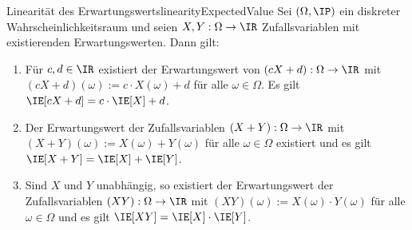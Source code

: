 \documentclass[language=ngerman,algolist]{TemplateLecture}
\begin{document}
\begin{thm}{Linearität des Erwartungswerts}{linearityExpectedValue}
    Sei $(\Omega, \IP)$ ein diskreter Wahrscheinlichkeitsraum und seien $X, Y: \Omega \to \IR$ Zufallsvariablen mit existierenden Erwartungswerten. Dann gilt:
    \begin{enumerate}[$(a)$]
        \item Für $c, d \in \IR$ existiert der Erwartungswert von $(cX + d): \Omega \to \IR$ mit $(cX + d)(\omega) := c \cdot X(\omega) + d$ für alle $\omega \in \Omega$. Es gilt $\IE[cX + d] = c \cdot \IE[X] + d$.
        \item Der Erwartungswert der Zufallsvariablen $(X + Y): \Omega \to \IR$ mit $(X + Y)(\omega) := X(\omega) + Y(\omega)$ für alle $\omega \in \Omega$ existiert und es gilt $\IE[X + Y] = \IE[X] + \IE[Y]$.
        \item Sind $X$ und $Y$ unabhängig, so existiert der Erwartungswert der Zufallsvariablen $(XY): \Omega \to \IR$ mit $(XY)(\omega) := X(\omega) \cdot Y(\omega)$ für alle $\omega \in \Omega$ und es gilt $\IE[XY] = \IE[X] \cdot \IE[Y]$.
    \end{enumerate}
\end{thm}
\end{document}
